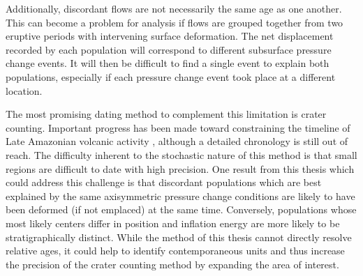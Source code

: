 Additionally, discordant flows are not necessarily the same age as one another. This can become a problem for analysis if flows are grouped together from two eruptive periods with intervening surface deformation. The net displacement recorded by each population will correspond to different subsurface pressure change events. It will then be difficult to find a single event to explain both populations, especially if each pressure change event took place at a different location.

The most promising dating method to complement this limitation is crater counting. Important progress has been made toward constraining the timeline of Late Amazonian volcanic activity \parencite{kneissl_map-projection-independent_2011,robbins_volcanic_2011,
robbins_large_2013, platz_crater-based_2013}, although a detailed chronology is still out of reach. The difficulty inherent to the stochastic nature of this method is that small regions are difficult to date with high precision. One result from this thesis which could address this challenge is that discordant populations which are best explained by the same axisymmetric pressure change conditions are likely to have been deformed (if not emplaced) at the same time. Conversely, populations whose most likely centers differ in position and inflation energy are more likely to be stratigraphically distinct. While the method of this thesis cannot directly resolve relative ages, it could help to identify contemporaneous units and thus increase the precision of the crater counting method by expanding the area of interest.